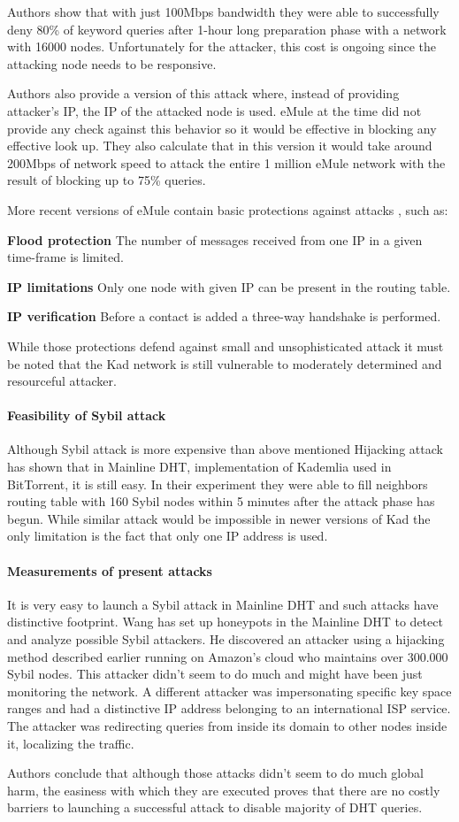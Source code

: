 Authors show that with just 100Mbps bandwidth they were able to successfully
deny 80\% of keyword queries after 1-hour long preparation phase with a
network with 16000 nodes.
Unfortunately for the attacker, this cost is ongoing since the attacking node
needs to be responsive.

Authors also provide a version of this attack where, instead of providing
attacker's IP, the IP of the attacked node is used. eMule at the time did not
provide any check against this behavior so it would be effective in blocking
any effective look up. They also calculate that in this version it would take
around 200Mbps of network speed to attack the entire 1 million eMule network
with the result of blocking up to 75\% queries.

More recent versions of eMule contain basic protections against attacks
\cite{tim11}, such as:
\begin{description}
  \item{\textbf{Flood protection}} The number of messages received from one IP
    in a given time-frame is limited.
  \item{\textbf{IP limitations}} Only one node with given IP can be present in
    the routing table.
  \item{\textbf{IP verification}} Before a contact is added a three-way
    handshake is performed.
\end{description}

While those protections defend against small and unsophisticated attack it must
be noted that the Kad network is still vulnerable to moderately determined and
resourceful attacker.

\paragraph{Feasibility of Sybil attack}
Although Sybil attack is more expensive than above mentioned Hijacking attack
\cite{tim11} has shown that in Mainline DHT, implementation of Kademlia used in
BitTorrent, it is still easy. In their experiment they were able to fill
neighbors routing table with 160 Sybil nodes within 5 minutes after the attack
phase has begun. While similar attack would be impossible in newer versions of
Kad the only limitation is the fact that only one IP address is used.

\paragraph{Measurements of present attacks}
It is very easy to launch a Sybil attack in Mainline DHT and such attacks have
distinctive footprint. Wang \cite{wan12a} has set up honeypots in the Mainline
DHT to detect and analyze possible Sybil attackers. He discovered an attacker
using a hijacking method described earlier running on Amazon's cloud who
maintains over 300.000 Sybil nodes. This attacker didn't seem to do much
and might have been just monitoring the network. A different attacker was
impersonating specific key space ranges and had a distinctive IP address
belonging to an international ISP service.
The attacker was redirecting queries from inside its domain
to other nodes inside it, localizing the traffic.

Authors conclude that although those attacks didn't seem to do much global harm,
the easiness with which they are executed proves that there are no costly
barriers to launching a successful attack to disable majority of DHT queries.
